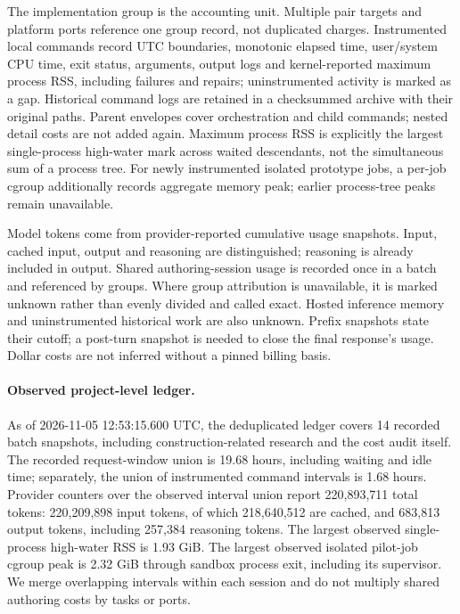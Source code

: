 \documentclass{article}
\begin{document}
The implementation group is the accounting unit. Multiple pair targets and platform ports reference one group record, not duplicated charges. Instrumented local commands record UTC boundaries, monotonic elapsed time, user/system CPU time, exit status, arguments, output logs and kernel-reported maximum process RSS, including failures and repairs; uninstrumented activity is marked as a gap. Historical command logs are retained in a checksummed archive with their original paths. Parent envelopes cover orchestration and child commands; nested detail costs are not added again. Maximum process RSS is explicitly the largest single-process high-water mark across waited descendants, not the simultaneous sum of a process tree. For newly instrumented isolated prototype jobs, a per-job cgroup additionally records aggregate memory peak; earlier process-tree peaks remain unavailable.

Model tokens come from provider-reported cumulative usage snapshots. Input, cached input, output and reasoning are distinguished; reasoning is already included in output. Shared authoring-session usage is recorded once in a batch and referenced by groups. Where group attribution is unavailable, it is marked unknown rather than evenly divided and called exact. Hosted inference memory and uninstrumented historical work are also unknown. Prefix snapshots state their cutoff; a post-turn snapshot is needed to close the final response's usage. Dollar costs are not inferred without a pinned billing basis.

\paragraph{Observed project-level ledger.} As of 2026-11-05 12:53:15.600 UTC, the deduplicated ledger covers 14 recorded batch snapshots, including construction-related research and the cost audit itself. The recorded request-window union is 19.68 hours, including waiting and idle time; separately, the union of instrumented command intervals is 1.68 hours. Provider counters over the observed interval union report 220,893,711 total tokens: 220,209,898 input tokens, of which 218,640,512 are cached, and 683,813 output tokens, including 257,384 reasoning tokens. The largest observed single-process high-water RSS is 1.93 GiB. The largest observed isolated pilot-job cgroup peak is 2.32 GiB through sandbox process exit, including its supervisor. We merge overlapping intervals within each session and do not multiply shared authoring costs by tasks or ports.
\end{document}
